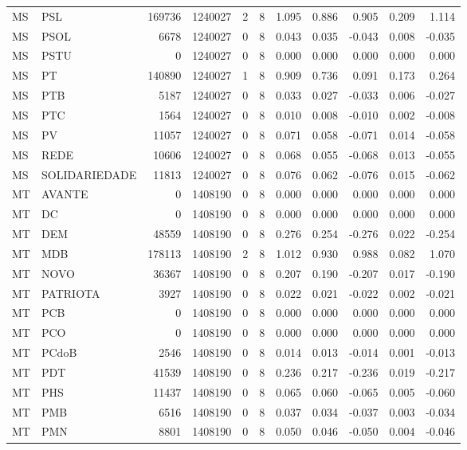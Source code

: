 \begin{landscape}
\begin{longtable}{llrrrrrrrrr}
MS & PSL & 169736 & 1240027 & 2 & 8 & 1.095 & 0.886 & 0.905 & 0.209 & 1.114 \\
MS & PSOL & 6678 & 1240027 & 0 & 8 & 0.043 & 0.035 & -0.043 & 0.008 & -0.035 \\
MS & PSTU & 0 & 1240027 & 0 & 8 & 0.000 & 0.000 & 0.000 & 0.000 & 0.000 \\
MS & PT & 140890 & 1240027 & 1 & 8 & 0.909 & 0.736 & 0.091 & 0.173 & 0.264 \\
MS & PTB & 5187 & 1240027 & 0 & 8 & 0.033 & 0.027 & -0.033 & 0.006 & -0.027 \\
MS & PTC & 1564 & 1240027 & 0 & 8 & 0.010 & 0.008 & -0.010 & 0.002 & -0.008 \\
MS & PV & 11057 & 1240027 & 0 & 8 & 0.071 & 0.058 & -0.071 & 0.014 & -0.058 \\
MS & REDE & 10606 & 1240027 & 0 & 8 & 0.068 & 0.055 & -0.068 & 0.013 & -0.055 \\
MS & SOLIDARIEDADE & 11813 & 1240027 & 0 & 8 & 0.076 & 0.062 & -0.076 & 0.015 & -0.062 \\
MT & AVANTE & 0 & 1408190 & 0 & 8 & 0.000 & 0.000 & 0.000 & 0.000 & 0.000 \\
MT & DC & 0 & 1408190 & 0 & 8 & 0.000 & 0.000 & 0.000 & 0.000 & 0.000 \\
MT & DEM & 48559 & 1408190 & 0 & 8 & 0.276 & 0.254 & -0.276 & 0.022 & -0.254 \\
MT & MDB & 178113 & 1408190 & 2 & 8 & 1.012 & 0.930 & 0.988 & 0.082 & 1.070 \\
MT & NOVO & 36367 & 1408190 & 0 & 8 & 0.207 & 0.190 & -0.207 & 0.017 & -0.190 \\
MT & PATRIOTA & 3927 & 1408190 & 0 & 8 & 0.022 & 0.021 & -0.022 & 0.002 & -0.021 \\
MT & PCB & 0 & 1408190 & 0 & 8 & 0.000 & 0.000 & 0.000 & 0.000 & 0.000 \\
MT & PCO & 0 & 1408190 & 0 & 8 & 0.000 & 0.000 & 0.000 & 0.000 & 0.000 \\
MT & PCdoB & 2546 & 1408190 & 0 & 8 & 0.014 & 0.013 & -0.014 & 0.001 & -0.013 \\
MT & PDT & 41539 & 1408190 & 0 & 8 & 0.236 & 0.217 & -0.236 & 0.019 & -0.217 \\
MT & PHS & 11437 & 1408190 & 0 & 8 & 0.065 & 0.060 & -0.065 & 0.005 & -0.060 \\
MT & PMB & 6516 & 1408190 & 0 & 8 & 0.037 & 0.034 & -0.037 & 0.003 & -0.034 \\
MT & PMN & 8801 & 1408190 & 0 & 8 & 0.050 & 0.046 & -0.050 & 0.004 & -0.046 \\

\end{longtable}
\end{landscape}
